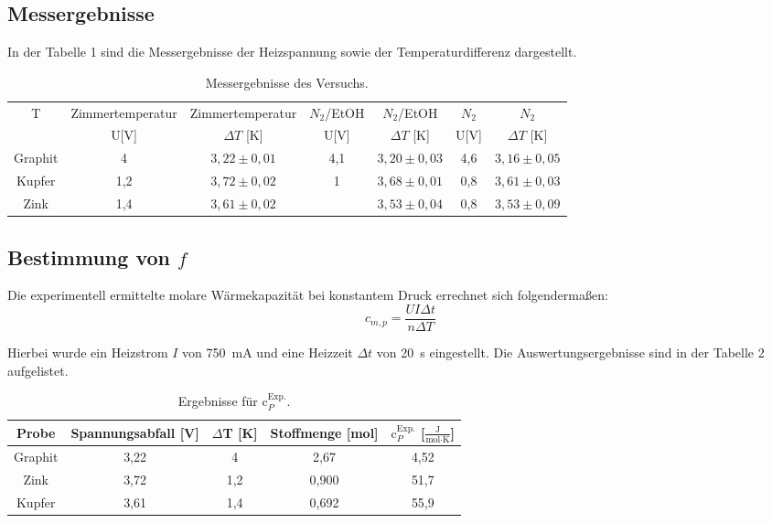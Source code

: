 \documentclass[12pt,a4paper,titlepage,headinclude,bibtotoc]{scrartcl}
\begin{document}
\subsection{Messergebnisse}
In der Tabelle 1 sind die Messergebnisse der Heizspannung sowie der Temperaturdifferenz dargestellt.
\begin{table}[h!]
\centering
\caption{Messergebnisse des Versuchs.}
\begin{tabular}{c|c|c|c|c|c|c}
T & Zimmertemperatur &Zimmertemperatur& $N_2$/EtOH& $N_2$/EtOH& $N_2$& $N_2$\\ 
& U[V]& $\Delta T$ [K]&U[V]& $\Delta T$ [K]&U[V]& $\Delta T$ [K]\\
\hline
Graphit & 4 & $3,22\pm0,01$ & 4,1 &$3,20\pm0,03$&4,6&$3,16\pm0,05$\\  
Kupfer & 1,2 & $3,72\pm0,02$ & 1 &$3,68\pm 0,01$&0,8&$3,61\pm0,03$\\ 
Zink & 1,4 & $3,61\pm 0,02$ & &$3,53\pm0,04$&0,8&$3,53\pm 0,09$ \\ 
\end{tabular} 
\end{table}
\FloatBarrier
\subsection{Bestimmung von $f$}

Die experimentell ermittelte molare Wärmekapazität bei konstantem Druck errechnet sich folgendermaßen:\\

\begin{equation}
c_{m,p} = \frac{UI\Delta t}{n\Delta T}
\end{equation}

Hierbei wurde ein Heizstrom $I$ von 750~mA und eine Heizzeit $\Delta t$ von 20~s eingestellt. Die Auswertungsergebnisse sind in der Tabelle 2 aufgelistet.
\begin{table}[h!]
\centering
\caption{Ergebnisse für $\text{c}_P^{\text{Exp.}}$.}
\begin{tabular}{c|c|c|c|c}
Probe& Spannungsabfall [V] & $\Delta$T [K]& Stoffmenge [mol] &  $\text{c}_P^{\text{Exp.}}$ [$\frac{\text{J}}{\text{mol}\cdot\text{K}}$]\\
\hline
Graphit & 3,22&4 &2,67 &4,52 \\
\hline
Zink & 3,72 & 1,2&0,900&51,7  \\
\hline
Kupfer & 3,61& 1,4& 0,692 &55,9\\
\end{tabular}
\end{table}
\FloatBarrier 
\end{document}
